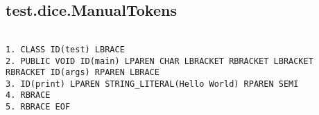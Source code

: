 \subsection{test.dice.ManualTokens}
\begin{verbatim}

1. CLASS ID(test) LBRACE
2. PUBLIC VOID ID(main) LPAREN CHAR LBRACKET RBRACKET LBRACKET RBRACKET ID(args) RPAREN LBRACE
3. ID(print) LPAREN STRING_LITERAL(Hello World) RPAREN SEMI
4. RBRACE
5. RBRACE EOF

\end{verbatim}
